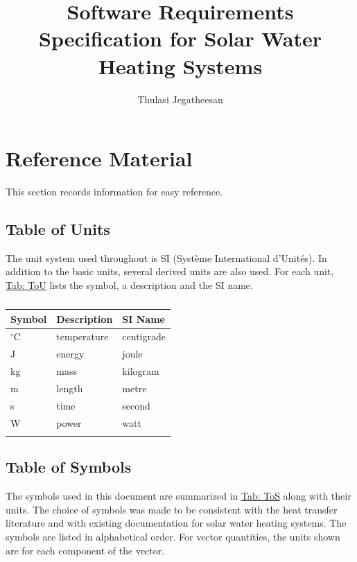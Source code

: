\documentclass[12pt]{article}
\title{Software Requirements Specification for Solar Water Heating Systems}
\author{Thulasi Jegatheesan}
\begin{document}
\maketitle
\tableofcontents
\newpage
\section{Reference Material}
\label{Sec:RefMat}
This section records information for easy reference.

\subsection{Table of Units}
\label{Sec:ToU}
The unit system used throughout is SI (Système International d'Unités). In addition to the basic units, several derived units are also used. For each unit, \hyperref[Table:ToU]{Tab: ToU} lists the symbol, a description and the SI name.

\begin{longtable}{l l l}
\toprule
\textbf{Symbol} & \textbf{Description} & \textbf{SI Name}
\\
\midrule
\endhead
${}^{\circ}$C & temperature & centigrade
\\
J & energy & joule
\\
kg & mass & kilogram
\\
m & length & metre
\\
s & time & second
\\
W & power & watt
\\
\bottomrule
\caption{}
\label{Table:ToU}
\end{longtable}
\subsection{Table of Symbols}
\label{Sec:ToS}
The symbols used in this document are summarized in \hyperref[Table:ToS]{Tab: ToS} along with their units. The choice of symbols was made to be consistent with the heat transfer literature and with existing documentation for solar water heating systems. The symbols are listed in alphabetical order. For vector quantities, the units shown are for each component of the vector.
\end{document}
